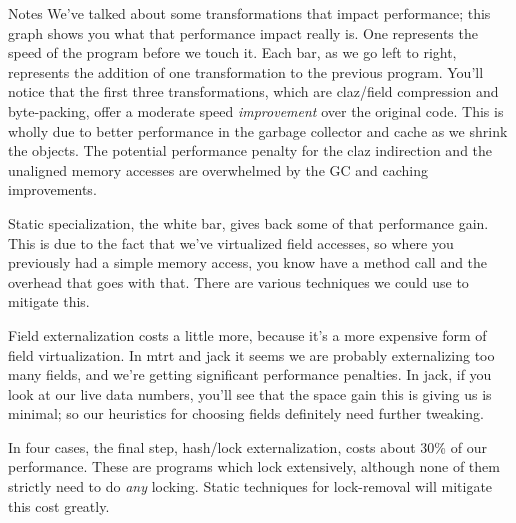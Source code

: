 \documentclass[%
pdf,
colorBG,
slideColor,
nototal,
oqe
]{prosper}
\newenvironment{talknotes}{\begin{slide}{Notes}\tiny}{\end{slide}}
\begin{document}
\begin{talknotes}
We've talked about some transformations that impact performance;
this graph shows you what that performance impact really is.
One represents the speed of the program before we touch it.
Each bar, as we go left to right, represents the addition of one
transformation to the previous program.
You'll notice that the first three transformations, which are
claz/field compression and byte-packing, offer a moderate speed
\emph{improvement} over the original code.  This is wholly due to
better performance in the garbage collector and cache as we shrink the
objects.  The potential performance penalty for the claz indirection
and the unaligned memory accesses are overwhelmed by the GC and caching
improvements.

Static specialization, the white bar, gives back some of that
performance gain.  This is due to the fact that we've virtualized
field accesses, so where you previously had a simple memory access,
you know have a method call and the overhead that goes with that.
There are various techniques we could use to mitigate this.

Field externalization costs a little more, because it's a more
expensive form of field virtualization.  In mtrt and jack it seems we
are probably externalizing too many fields, and we're getting
significant performance penalties.  In jack, if you look at our live
data numbers, you'll see that the space gain this is giving us is
minimal; so our heuristics for choosing fields definitely need further
tweaking.

In four cases, the final step, hash/lock externalization, costs about
30\% of our performance.  These are programs which lock extensively,
although none of them strictly need to do \emph{any} locking.
Static techniques for lock-removal will mitigate this cost greatly.

~%
\end{talknotes}
\end{document}
